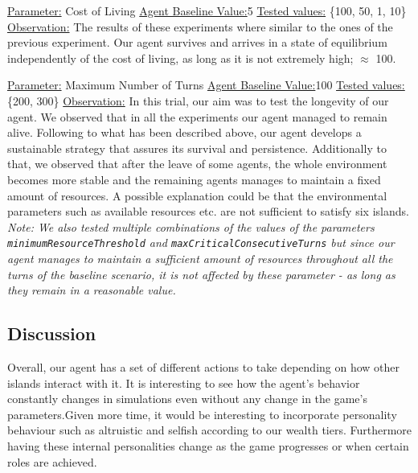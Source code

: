 \underline{Parameter:} Cost of Living \newline
\underline{Agent Baseline Value:}5 \newline
\underline{Tested values:} \{100, 50, 1, 10\} \newline
\underline{Observation:} \newline
The results of these experiments where similar to the ones of the previous experiment. Our agent survives and arrives in a state of equilibrium independently of the cost of living, as long as it is not extremely high; $\approx$ 100.

\underline{Parameter:} Maximum Number of Turns \newline
\underline{Agent Baseline Value:}100 \newline
\underline{Tested values:} \{200, 300\} \newline
\underline{Observation:} \newline
In this trial, our aim was to test the longevity of our agent. We observed that in all the experiments our agent managed to remain alive. Following to what has been described above, our agent develops a sustainable strategy that assures its survival and persistence. Additionally to that, we observed that after the leave of some agents, the whole environment becomes more stable and the remaining agents manages to maintain a fixed amount of resources. A possible explanation could be that the environmental parameters such as available resources etc. are not sufficient to satisfy six islands.
\newline
\textit{Note: We also tested multiple combinations of the values of the parameters \texttt{minimumResourceThreshold} and \texttt{maxCriticalConsecutiveTurns} but since our agent manages to maintain a sufficient amount of resources throughout all the turns of the baseline scenario, it is not affected by these parameter - as long as they remain in a reasonable value.}

















\subsection{Discussion}

Overall, our agent has a set of different actions to take depending on how other islands interact with it. It is interesting to see how the agent's behavior constantly changes in simulations even without any change in the game's parameters.Given more time, it would be interesting to incorporate personality behaviour such as altruistic and selfish according to our wealth tiers. Furthermore having these internal personalities change as the game progresses or when certain roles are achieved. 



%




